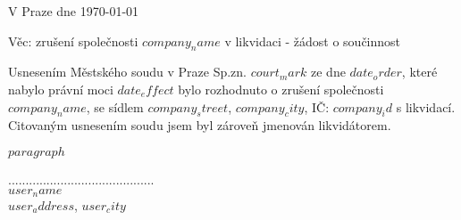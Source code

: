 \documentclass{../static/myletter}
\begin{document}
\begin{letter}{}
\opening{V Praze dne \today}
Věc: zrušení společnosti \textbf{$company_name$} v likvidaci - žádost o součinnost                  

Usnesením Městského soudu v Praze Sp.zn. $court_mark$ ze dne $date_order$, které nabylo právní moci $date_effect$ bylo rozhodnuto o zrušení společnosti $company_name$, se sídlem $company_street$, $company_city$,  IČ: \textbf{$company_id$} s likvidací. Citovaným usnesením soudu jsem byl zároveň jmenován likvidátorem.  

$paragraph$

\hspace*{5cm}

\closing{..........................................\\ $user_name$ \\ $user_address$, $user_city$}
\end{letter}
\end{document}
